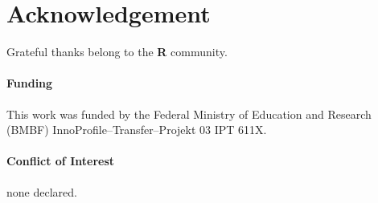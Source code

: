 \documentclass{bioinfo}
\begin{document}
\section*{Acknowledgement}
\begin{methods}
Grateful thanks belong to the \textbf{R} community.

\paragraph{Funding\textcolon} This work was funded by the Federal Ministry of Education and Research (BMBF)
 InnoProfile--Transfer--Projekt 03 IPT 611X.

\paragraph{Conflict of Interest\textcolon} none declared.
\end{methods}


%
%
%
%
%
%
%

\end{document}
